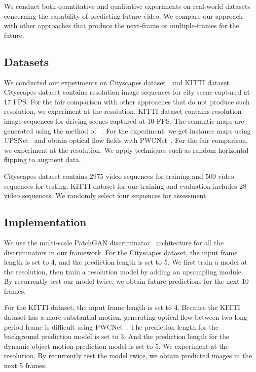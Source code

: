 \documentclass[10pt,twocolumn,letterpaper]{article}
\begin{document}
We conduct both quantitative and qualitative experiments on real-world datasets concerning the capability of predicting future video. We compare our approach with other approaches that produce the next-frame or multiple-frames for the future.

\subsection{Datasets}
We conducted our experiments on Cityscapes dataset~\cite{Cordts2016Cityscapes} and KITTI dataset ~\cite{kitti}. Cityscapes dataset contains  resolution image sequences for city scene captured at 17 FPS. For the fair comparison with other approaches that do not produce such resolution, we experiment at the   resolution.
KITTI dataset contains  resolution image sequences for driving scenes captured at 10 FPS. The semantic maps are generated using the method of ~\cite{semantic_cvpr19}. For the experiment, we get instance maps using UPSNet~\cite{xiong19upsnet} and obtain optical flow fields with PWCNet~\cite{Sun2018PWC-Net}. For the fair comparison, we experiment at the  resolution. We apply techniques such as random horizontal flipping to augment data.

Cityscapes dataset contains 2975 video sequences for training and 500 video sequences for testing. KITTI dataset for our training and evaluation includes 28 video sequences. We randomly select four sequences for assessment. 

\subsection{Implementation}
We use the multi-scale PatchGAN discriminator~\cite{pix2pix2017} architecture for all the discriminators in our framework.
For the Cityscapes dataset, the input frame length is set to 4, and the prediction length is set to 5. We first train a model at the  resolution, then train a  resolution model by adding an upsampling module. By recurrently test our model twice, we obtain future predictions for the next 10 frames.

For the KITTI dataset, the input frame length is set to 4. Because the KITTI dataset has a more substantial motion, generating optical flow between two long period frame is difficult using PWCNet~\cite{Sun2018PWC-Net}. The prediction length for the background prediction model is set to 3. And the prediction length for the dynamic object motion prediction model is set to 5. We experiment at the  resolution. By recurrently test the model twice, we obtain predicted images in the next 5 frames.
\end{document}
